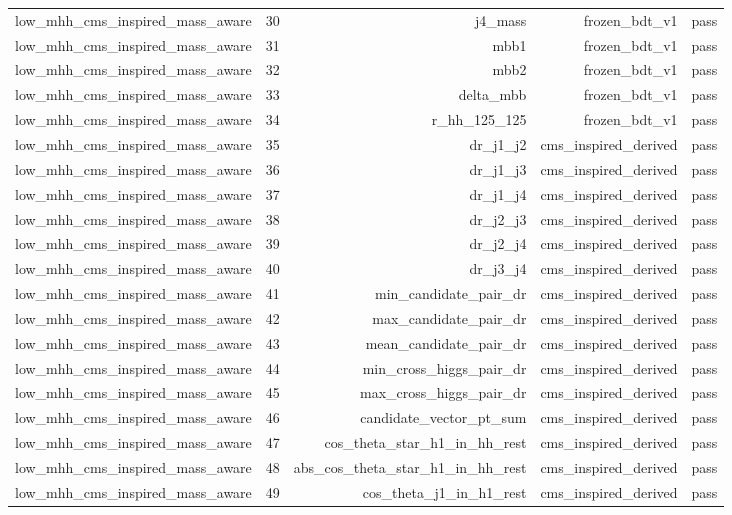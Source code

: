 \begin{table}[htbp]
\begin{tabular}{lrrrr}
low\_mhh\_cms\_inspired\_mass\_aware & 30 & j4\_mass & frozen\_bdt\_v1 & pass \\
low\_mhh\_cms\_inspired\_mass\_aware & 31 & mbb1 & frozen\_bdt\_v1 & pass \\
low\_mhh\_cms\_inspired\_mass\_aware & 32 & mbb2 & frozen\_bdt\_v1 & pass \\
low\_mhh\_cms\_inspired\_mass\_aware & 33 & delta\_mbb & frozen\_bdt\_v1 & pass \\
low\_mhh\_cms\_inspired\_mass\_aware & 34 & r\_hh\_125\_125 & frozen\_bdt\_v1 & pass \\
low\_mhh\_cms\_inspired\_mass\_aware & 35 & dr\_j1\_j2 & cms\_inspired\_derived & pass \\
low\_mhh\_cms\_inspired\_mass\_aware & 36 & dr\_j1\_j3 & cms\_inspired\_derived & pass \\
low\_mhh\_cms\_inspired\_mass\_aware & 37 & dr\_j1\_j4 & cms\_inspired\_derived & pass \\
low\_mhh\_cms\_inspired\_mass\_aware & 38 & dr\_j2\_j3 & cms\_inspired\_derived & pass \\
low\_mhh\_cms\_inspired\_mass\_aware & 39 & dr\_j2\_j4 & cms\_inspired\_derived & pass \\
low\_mhh\_cms\_inspired\_mass\_aware & 40 & dr\_j3\_j4 & cms\_inspired\_derived & pass \\
low\_mhh\_cms\_inspired\_mass\_aware & 41 & min\_candidate\_pair\_dr & cms\_inspired\_derived & pass \\
low\_mhh\_cms\_inspired\_mass\_aware & 42 & max\_candidate\_pair\_dr & cms\_inspired\_derived & pass \\
low\_mhh\_cms\_inspired\_mass\_aware & 43 & mean\_candidate\_pair\_dr & cms\_inspired\_derived & pass \\
low\_mhh\_cms\_inspired\_mass\_aware & 44 & min\_cross\_higgs\_pair\_dr & cms\_inspired\_derived & pass \\
low\_mhh\_cms\_inspired\_mass\_aware & 45 & max\_cross\_higgs\_pair\_dr & cms\_inspired\_derived & pass \\
low\_mhh\_cms\_inspired\_mass\_aware & 46 & candidate\_vector\_pt\_sum & cms\_inspired\_derived & pass \\
low\_mhh\_cms\_inspired\_mass\_aware & 47 & cos\_theta\_star\_h1\_in\_hh\_rest & cms\_inspired\_derived & pass \\
low\_mhh\_cms\_inspired\_mass\_aware & 48 & abs\_cos\_theta\_star\_h1\_in\_hh\_rest & cms\_inspired\_derived & pass \\
low\_mhh\_cms\_inspired\_mass\_aware & 49 & cos\_theta\_j1\_in\_h1\_rest & cms\_inspired\_derived & pass \\

\end{tabular}
\end{table}

